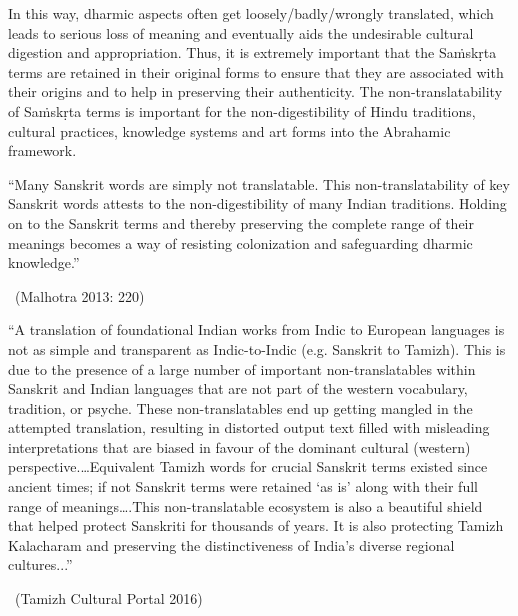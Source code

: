 In this way, dharmic aspects often get loosely/badly/wrongly translated, which leads to serious loss of meaning and eventually aids the undesirable cultural digestion and appropriation. Thus, it is extremely important that the Saṁskṛta terms are retained in their original forms to ensure that they are associated with their origins and to help in preserving their authenticity. The non-translatability of Saṁskṛta terms is important for the non-digestibility of Hindu traditions, cultural practices, knowledge systems and art forms into the Abrahamic framework.

\begin{myquote}
“Many Sanskrit words are simply not translatable. This non-translatability of key Sanskrit words attests to the non-digestibility of many Indian traditions. Holding on to the Sanskrit terms and thereby preserving the complete range of their meanings becomes a way of resisting colonization and safeguarding dharmic knowledge.” 

~\hfill (Malhotra 2013: 220)
\end{myquote}

\begin{myquote}
“A translation of foundational Indian works from Indic to European languages is not as simple and transparent as Indic-to-Indic (e.g. Sanskrit to Tamizh). This is due to the presence of a large number of important non-translatables within Sanskrit and Indian languages that are not part of the western vocabulary, tradition, or psyche. These non-translatables end up getting mangled in the attempted translation, resulting in distorted output text filled with misleading interpretations that are biased in favour of the dominant cultural (western) perspective.…Equivalent Tamizh words for crucial Sanskrit terms existed since ancient times; if not Sanskrit terms were retained ‘as is’ along with their full range of meanings….This non-translatable ecosystem is also a beautiful shield that helped protect Sanskriti for thousands of years. It is also protecting Tamizh Kalacharam and preserving the distinctiveness of India’s diverse regional cultures...” 

~\hfill (Tamizh Cultural Portal 2016)
\end{myquote}


